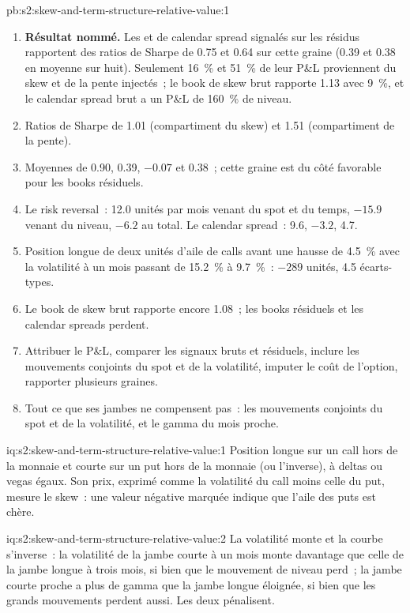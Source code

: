 \begin{solution}{pb:s2:skew-and-term-structure-relative-value:1}
\begin{enumerate}
\item \textbf{Résultat nommé.} Les  et de calendar spread signalés sur les résidus rapportent des ratios de Sharpe de 0.75 et 0.64 sur cette graine (0.39 et 0.38 en
moyenne sur huit). Seulement 16~\% et 51~\% de leur P\&L proviennent du skew et de la pente injectés~; le book de skew brut rapporte 1.13 avec 9~\%, et le
calendar spread brut a un P\&L de 160~\% de niveau.
\item Ratios de Sharpe de 1.01 (compartiment du skew) et 1.51 (compartiment de la pente).
\item Moyennes de 0.90, 0.39, $-0.07$ et 0.38~; cette graine est du côté favorable pour les books résiduels.
\item Le risk reversal~: 12.0 unités par mois venant du spot et du temps, $-15.9$ venant du niveau, $-6.2$ au total. Le calendar spread~: 9.6, $-3.2$, 4.7.
\item Position longue de deux unités d'aile de calls avant une hausse de 4.5~\% avec la volatilité à un mois passant de 15.2~\% à 9.7~\%~: $-289$ unités, 4.5 écarts-types.
\item Le book de skew brut rapporte encore 1.08~; les books résiduels et les calendar spreads perdent.
\item Attribuer le P\&L, comparer les signaux bruts et résiduels, inclure les mouvements conjoints du spot et de la volatilité, imputer le coût de l'option, rapporter plusieurs graines.
\item Tout ce que ses jambes ne compensent pas~: les mouvements conjoints du spot et de la volatilité, et le gamma du mois proche.
\end{enumerate}
\end{solution}

\begin{solution}{iq:s2:skew-and-term-structure-relative-value:1}
Position longue sur un call hors de la monnaie et courte sur un put hors de la monnaie (ou l'inverse), à deltas ou vegas égaux. Son prix, exprimé comme la volatilité du call moins
celle du put, mesure le skew~: une valeur négative marquée indique que l'aile des puts est chère.
\end{solution}

\begin{solution}{iq:s2:skew-and-term-structure-relative-value:2}
La volatilité monte et la courbe s'inverse~: la volatilité de la jambe courte à un mois monte davantage que celle de la jambe longue à trois mois, si bien que le mouvement de niveau perd~; la jambe courte proche a
plus de gamma que la jambe longue éloignée, si bien que les grands mouvements perdent aussi. Les deux pénalisent.
\end{solution}

